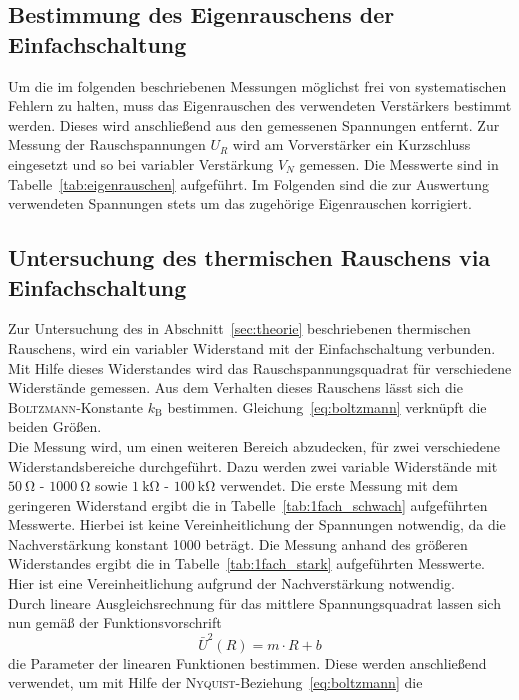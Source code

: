 \subsection{Bestimmung des Eigenrauschens der Einfachschaltung}
%
Um die im folgenden beschriebenen Messungen möglichst frei von systematischen
Fehlern zu halten, muss das Eigenrauschen des verwendeten Verstärkers bestimmt
werden. Dieses wird anschließend aus den gemessenen Spannungen entfernt. Zur
Messung der Rauschspannungen $U_R$ wird am Vorverstärker ein Kurzschluss
eingesetzt und so bei variabler Verstärkung $V_N$ gemessen. Die Messwerte sind
in Tabelle~\ref{tab:eigenrauschen} aufgeführt. Im Folgenden sind die zur
Auswertung verwendeten Spannungen stets um das zugehörige Eigenrauschen
korrigiert.
%
\subsection{Untersuchung des thermischen Rauschens via Einfachschaltung}
%
Zur Untersuchung des in Abschnitt~\ref{sec:theorie} beschriebenen thermischen
Rauschens, wird ein variabler Widerstand mit der Einfachschaltung verbunden. Mit
Hilfe dieses Widerstandes wird das Rauschspannungsquadrat für verschiedene
Widerstände gemessen. Aus dem Verhalten dieses Rauschens lässt sich die
\textsc{Boltzmann}-Konstante $k_\text{B}$ bestimmen. Gleichung~\eqref{eq:boltzmann} verknüpft die beiden Größen. \\
Die Messung wird, um einen weiteren Bereich abzudecken, für zwei verschiedene
Widerstandsbereiche durchgeführt. Dazu werden zwei variable Widerstände mit
$\SI{50}{\ohm}$ - $\SI{1000}{\ohm}$ sowie $\SI{1}{\kilo\ohm}$ -
$\SI{100}{\kilo\ohm}$ verwendet. Die erste Messung mit dem geringeren Widerstand
ergibt die in Tabelle~\ref{tab:1fach_schwach} aufgeführten Messwerte. Hierbei
ist keine Vereinheitlichung der Spannungen notwendig, da die Nachverstärkung
konstant \num{1000} beträgt. Die Messung anhand des größeren Widerstandes ergibt
die in Tabelle~\ref{tab:1fach_stark} aufgeführten Messwerte. Hier ist eine
Vereinheitlichung aufgrund der Nachverstärkung notwendig. \\
Durch lineare Ausgleichsrechnung für das mittlere Spannungsquadrat lassen sich
nun gemäß der Funktionsvorschrift
%
\begin{equation}
  \bar{U}^2(R)=m\cdot R + b
  \label{eq:linear}
\end{equation}
%
die Parameter der linearen Funktionen bestimmen. Diese werden anschließend
verwendet, um mit Hilfe der \textsc{Nyquist}-Beziehung~\eqref{eq:boltzmann} die
